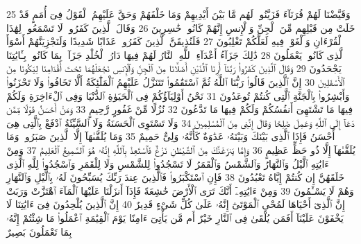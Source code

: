 {\tiny\colorbox{cl_aya}{25}} وَقَيَّضْنَا لَهُمْ قُرَنَآءَ فَزَيَّنُوا۟ لَهُم مَّا بَيْنَ أَيْدِيهِمْ وَمَا خَلْفَهُمْ وَحَقَّ عَلَيْهِمُ ٱلْقَوْلُ فِىٓ أُمَمٍ قَدْ خَلَتْ مِن قَبْلِهِم مِّنَ ٱلْجِنِّ وَٱلْإِنسِ إِنَّهُمْ كَانُوا۟ خَٰسِرِينَ
{\tiny\colorbox{cl_aya}{26}} وَقَالَ ٱلَّذِينَ كَفَرُوا۟ لَا تَسْمَعُوا۟ لِهَٰذَا ٱلْقُرْءَانِ وَٱلْغَوْا۟ فِيهِ لَعَلَّكُمْ تَغْلِبُونَ
{\tiny\colorbox{cl_aya}{27}} فَلَنُذِيقَنَّ ٱلَّذِينَ كَفَرُوا۟ عَذَابًا شَدِيدًا وَلَنَجْزِيَنَّهُمْ أَسْوَأَ ٱلَّذِى كَانُوا۟ يَعْمَلُونَ
{\tiny\colorbox{cl_aya}{28}} ذَٰلِكَ جَزَآءُ أَعْدَآءِ ٱللَّهِ ٱلنَّارُ لَهُمْ فِيهَا دَارُ ٱلْخُلْدِ جَزَآءًۢ بِمَا كَانُوا۟ بِـَٔايَٰتِنَا يَجْحَدُونَ
{\tiny\colorbox{cl_aya}{29}} وَقَالَ ٱلَّذِينَ كَفَرُوا۟ رَبَّنَآ أَرِنَا ٱلَّذَيْنِ أَضَلَّانَا مِنَ ٱلْجِنِّ وَٱلْإِنسِ نَجْعَلْهُمَا تَحْتَ أَقْدَامِنَا لِيَكُونَا مِنَ ٱلْأَسْفَلِينَ
{\tiny\colorbox{cl_aya}{30}} إِنَّ ٱلَّذِينَ قَالُوا۟ رَبُّنَا ٱللَّهُ ثُمَّ ٱسْتَقَٰمُوا۟ تَتَنَزَّلُ عَلَيْهِمُ ٱلْمَلَٰٓئِكَةُ أَلَّا تَخَافُوا۟ وَلَا تَحْزَنُوا۟ وَأَبْشِرُوا۟ بِٱلْجَنَّةِ ٱلَّتِى كُنتُمْ تُوعَدُونَ
{\tiny\colorbox{cl_aya}{31}} نَحْنُ أَوْلِيَآؤُكُمْ فِى ٱلْحَيَوٰةِ ٱلدُّنْيَا وَفِى ٱلْءَاخِرَةِ وَلَكُمْ فِيهَا مَا تَشْتَهِىٓ أَنفُسُكُمْ وَلَكُمْ فِيهَا مَا تَدَّعُونَ
{\tiny\colorbox{cl_aya}{32}} نُزُلًا مِّنْ غَفُورٍ رَّحِيمٍ
{\tiny\colorbox{cl_aya}{33}} وَمَنْ أَحْسَنُ قَوْلًا مِّمَّن دَعَآ إِلَى ٱللَّهِ وَعَمِلَ صَٰلِحًا وَقَالَ إِنَّنِى مِنَ ٱلْمُسْلِمِينَ
{\tiny\colorbox{cl_aya}{34}} وَلَا تَسْتَوِى ٱلْحَسَنَةُ وَلَا ٱلسَّيِّئَةُ ٱدْفَعْ بِٱلَّتِى هِىَ أَحْسَنُ فَإِذَا ٱلَّذِى بَيْنَكَ وَبَيْنَهُۥ عَدَٰوَةٌ كَأَنَّهُۥ وَلِىٌّ حَمِيمٌ
{\tiny\colorbox{cl_aya}{35}} وَمَا يُلَقَّىٰهَآ إِلَّا ٱلَّذِينَ صَبَرُوا۟ وَمَا يُلَقَّىٰهَآ إِلَّا ذُو حَظٍّ عَظِيمٍ
{\tiny\colorbox{cl_aya}{36}} وَإِمَّا يَنزَغَنَّكَ مِنَ ٱلشَّيْطَٰنِ نَزْغٌ فَٱسْتَعِذْ بِٱللَّهِ إِنَّهُۥ هُوَ ٱلسَّمِيعُ ٱلْعَلِيمُ
{\tiny\colorbox{cl_aya}{37}} وَمِنْ ءَايَٰتِهِ ٱلَّيْلُ وَٱلنَّهَارُ وَٱلشَّمْسُ وَٱلْقَمَرُ لَا تَسْجُدُوا۟ لِلشَّمْسِ وَلَا لِلْقَمَرِ وَٱسْجُدُوا۟ لِلَّهِ ٱلَّذِى خَلَقَهُنَّ إِن كُنتُمْ إِيَّاهُ تَعْبُدُونَ
{\tiny\colorbox{cl_aya}{38}} فَإِنِ ٱسْتَكْبَرُوا۟ فَٱلَّذِينَ عِندَ رَبِّكَ يُسَبِّحُونَ لَهُۥ بِٱلَّيْلِ وَٱلنَّهَارِ وَهُمْ لَا يَسْـَٔمُونَ
{\tiny\colorbox{cl_aya}{39}} وَمِنْ ءَايَٰتِهِۦٓ أَنَّكَ تَرَى ٱلْأَرْضَ خَٰشِعَةً فَإِذَآ أَنزَلْنَا عَلَيْهَا ٱلْمَآءَ ٱهْتَزَّتْ وَرَبَتْ إِنَّ ٱلَّذِىٓ أَحْيَاهَا لَمُحْىِ ٱلْمَوْتَىٰٓ إِنَّهُۥ عَلَىٰ كُلِّ شَىْءٍ قَدِيرٌ
{\tiny\colorbox{cl_aya}{40}} إِنَّ ٱلَّذِينَ يُلْحِدُونَ فِىٓ ءَايَٰتِنَا لَا يَخْفَوْنَ عَلَيْنَآ أَفَمَن يُلْقَىٰ فِى ٱلنَّارِ خَيْرٌ أَم مَّن يَأْتِىٓ ءَامِنًا يَوْمَ ٱلْقِيَٰمَةِ ٱعْمَلُوا۟ مَا شِئْتُمْ إِنَّهُۥ بِمَا تَعْمَلُونَ بَصِيرٌ
